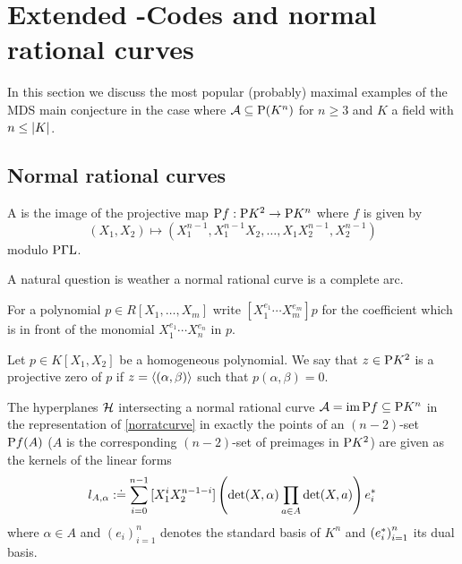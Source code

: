 
\section{Extended -Codes and normal rational curves}

In this section we discuss the most popular (probably) maximal examples of the MDS main conjecture in the case where $\cA\setleq \P(K^n)$ for $n\geq 3$ and $K$ a field with $n\leq\left|K\right|$.

\subsection{Normal rational curves}

\begin{definition}\label{norratcurve}
    A  is the image of the projective map $\mathrm{P}{f}:\mathrm{P}{K^2}\rightarrow\mathrm{P}{K^n}$ where $f$ is given by
    $$
    (X_1,X_2) \mapsto (X_1^{n-1},X_1^{n-1}X_2,\ldots,X_1X_2^{n-1},X_2^{n-1})
    $$
    modulo $\mathrm{P\Gamma L}$.
\end{definition}

A natural question is weather a normal rational curve is a complete arc.

\begin{definition}
    For a polynomial $p\in R[X_1,\ldots,X_m]$ write $[X_1^{e_1}\cdots X_m^{e_m}]p$ for the coefficient which is in front of the monomial $X_1^{e_1}\cdots X_n^{e_n}$ in $p$.
\end{definition}

\begin{definition}
    Let $p\in K[X_1,X_2]$ be a homogeneous polynomial. We say that $z\in\mathrm{P}{K^2}$ is a projective zero of $p$ if $z=\gen{(\alpha,\beta)}$ such that $p(\alpha,\beta)=0$. 
\end{definition}

\begin{lemma}\label{norrattandesc}
    The hyperplanes $\mathcal{H}$ intersecting a normal rational curve $\mathcal{A}=\mathop\mathrm{im}\mathrm{P}{f}\subseteq \mathrm{P}{K^n}$ in the representation of \autoref{norratcurve} in exactly the points of an $(n-2)$-set $\mathrm{P}{f}(A)$ ($A$ is the corresponding $(n-2)$-set of preimages in $\mathrm{P} K^2$) are given as the kernels of the linear forms 
    $$
    l_{A,\alpha}:\doteq\sum_{i=0}^{n-1}{[X_1^i X_2^{n-1-i}]\left(\det(X,\alpha)\prod_{a\in A}{\det(X,a)}\right)e^{\ast}_i}
    $$
    where $\alpha\in A$ and ${(e_i)}_{i=1}^n$ denotes the standard basis of $K^n$ and ${(e^{\ast}_i)}_{i=1}^n$ its dual basis.  
\end{lemma}

